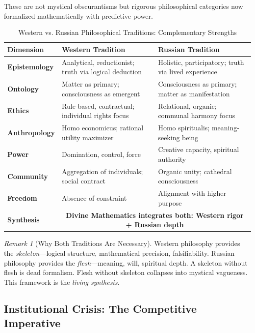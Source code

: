 \documentclass[11pt,a4paper]{article}
\theoremstyle{definition}
\theoremstyle{remark}
\newtheorem{remark}{Remark}[section]
\begin{document}
\begin{small}
These are not mystical obscurantisms but rigorous philosophical categories now formalized mathematically with predictive power.

\begin{table}[H]
\centering
\caption{Western vs. Russian Philosophical Traditions: Complementary Strengths}
\label{tab:west_vs_russia}
\begin{tabular}{|p{3cm}|p{5cm}|p{5cm}|}
\hline
\textbf{Dimension} & \textbf{Western Tradition} & \textbf{Russian Tradition} \\
\hline
\textbf{Epistemology} & Analytical, reductionist; truth via logical deduction & Holistic, participatory; truth via lived experience \\
\hline
\textbf{Ontology} & Matter as primary; consciousness as emergent & Consciousness as primary; matter as manifestation \\
\hline
\textbf{Ethics} & Rule-based, contractual; individual rights focus & Relational, organic; communal harmony focus \\
\hline
\textbf{Anthropology} & Homo economicus; rational utility maximizer & Homo spiritualis; meaning-seeking being \\
\hline
\textbf{Power} & Domination, control, force & Creative capacity, spiritual authority \\
\hline
\textbf{Community} & Aggregation of individuals; social contract & Organic unity; cathedral consciousness \\
\hline
\textbf{Freedom} & Absence of constraint & Alignment with higher purpose \\
\hline
\rowcolor{green!10}
\textbf{Synthesis} & \multicolumn{2}{c|}{\textbf{Divine Mathematics integrates both: Western rigor + Russian depth}} \\
\hline
\end{tabular}
\end{table}

\begin{remark}[Why Both Traditions Are Necessary]
Western philosophy provides the \textit{skeleton}—logical structure, mathematical precision, falsifiability. Russian philosophy provides the \textit{flesh}—meaning, will, spiritual depth. A skeleton without flesh is dead formalism. Flesh without skeleton collapses into mystical vagueness. This framework is the \textit{living synthesis}.
\end{remark}

\subsection{Institutional Crisis: The Competitive Imperative}


\end{small}
\end{document}
